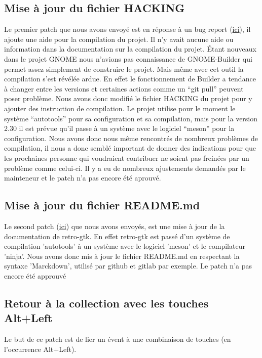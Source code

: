 \documentclass[12pt]{report}
\begin{document}
\subsection{Mise à jour du fichier HACKING}
Le premier patch que nous avons envoyé est en réponse à un bug report
(\href{http://bugzilla.gnome.org/show_bug.cgi?id=788692}{ici}), il ajoute une
aide pour la compilation du projet. \newline
Il n'y avait aucune aide ou information dans la documentation sur la compilation
du projet. Étant nouveaux dans le projet GNOME nous n'avions pas connaissance de 
GNOME-Builder qui permet assez simplement de construire le projet. Mais
même avec cet outil la compilation s'est révélée ardue. En effet 
le fonctionnement de Builder a tendance à changer entre les versions et certaines
actions comme un ``git pull'' peuvent poser problème.
Nous avons donc modifié le fichier HACKING du projet pour y ajouter des 
instruction de compilation. \newline
Le projet utilise pour le moment le système ``autotools'' pour sa configuration et 
sa compilation, mais pour la version 2.30 il est prévue qu'il passe à un système
avec le logiciel ``meson'' pour la configuration. \newline
Nous avons donc nous même rencontrés de nombreux problèmes de compilation,
il nous a donc semblé important de donner des indications pour que les 
prochaines personne qui voudraient contribuer ne soient pas freinées par un 
problème comme celui-ci.
Il y a eu de nombreux ajustements demandés par le mainteneur et le patch n'a 
pas encore été aprouvé. \newline

\subsection{Mise à jour du fichier README.md}
Le second patch (\href{http://bugzilla.gnome.org/show_bug.cgi?id=790454}{ici}) 
que nous avons envoyés, est une mise à jour de la documentation de retro-gtk.
En effet retro-gtk est passé d'un système de compilation 'autotools' à un
système avec le logiciel 'meson' et le compilateur 'ninja'.
Nous avons donc mis à jour le fichier README.md en respectant la syntaxe
'Marckdown', utilisé par github et gitlab par exemple.
Le patch n'a pas encore été approuvé \newline

\subsection{Retour à la collection avec les touches Alt+Left}
Le but de ce patch est de lier un évent à une combinaison de touches
(en l’occurrence Alt+Left).
\end{document}
